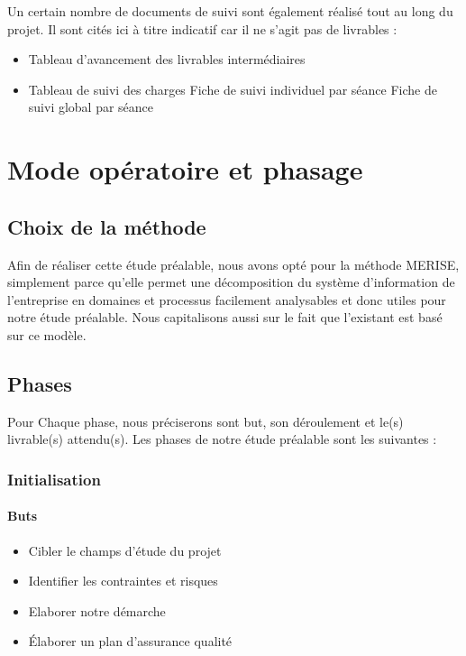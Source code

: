 Un certain nombre de documents de suivi sont également réalisé tout au long du projet. Il sont cités ici à titre indicatif car il ne s’agit pas de livrables :
\begin{itemize}
    \item Tableau d’avancement des livrables intermédiaires
    \item Tableau de suivi des charges
        \subitem Fiche de suivi individuel par séance
        \subitem Fiche de suivi global par séance
\end{itemize}

\section{Mode opératoire et phasage}

\subsection{Choix de la méthode}

Afin de réaliser cette étude préalable, nous avons opté pour la méthode MERISE, simplement parce qu'elle permet une décomposition du système d'information de l'entreprise en domaines et processus facilement analysables et donc utiles pour notre étude préalable. Nous capitalisons aussi sur le fait que l’existant est basé sur ce modèle.

\subsection{Phases}

Pour Chaque phase, nous préciserons sont but, son déroulement et le(s) livrable(s) attendu(s). Les phases de notre étude préalable sont les suivantes :

\subsubsection{Initialisation}

\paragraph{Buts}
\begin{itemize}
    \item Cibler le champs d’étude du projet
    \item Identifier les contraintes et risques
    \item Elaborer notre démarche
    \item Élaborer un plan d’assurance qualité
\end{itemize}


